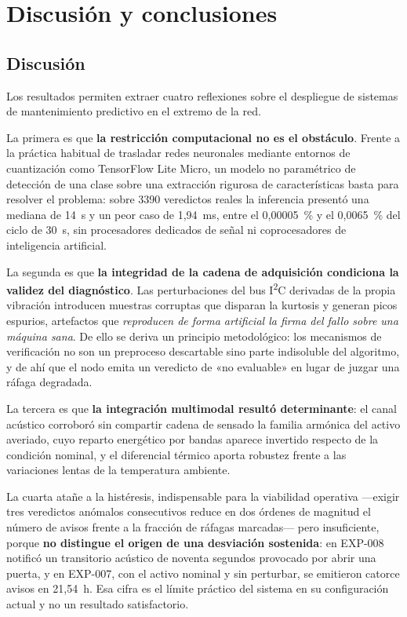 \chapter{Discusión y conclusiones}
\label{cap:conclusiones}

\section{Discusión}

Los resultados permiten extraer cuatro reflexiones sobre el despliegue de sistemas de
mantenimiento predictivo en el extremo de la red.

La primera es que \textbf{la restricción computacional no es el obstáculo}. Frente a la práctica
habitual de trasladar redes neuronales mediante entornos de cuantización como TensorFlow Lite
Micro, un modelo no paramétrico de detección de una clase sobre una extracción rigurosa de
características basta para resolver el problema: sobre 3390 veredictos reales la inferencia
presentó una mediana de \mbox{14 \textmu s} y un peor caso de \mbox{1,94 ms}, entre el
\mbox{0,00005~\%} y el \mbox{0,0065~\%} del ciclo de \mbox{30 s}, sin procesadores dedicados de
señal ni coprocesadores de inteligencia artificial.

La segunda es que \textbf{la integridad de la cadena de adquisición condiciona la validez del
diagnóstico}. Las perturbaciones del bus I\textsuperscript{2}C derivadas de la propia vibración
introducen muestras corruptas que disparan la kurtosis y generan picos espurios, artefactos que
\textit{reproducen de forma artificial la firma del fallo sobre una máquina sana}. De ello se
deriva un principio metodológico: los mecanismos de verificación no son un preproceso descartable
sino parte indisoluble del algoritmo, y de ahí que el nodo emita un veredicto de «no evaluable» en
lugar de juzgar una ráfaga degradada.

La tercera es que \textbf{la integración multimodal resultó determinante}: el canal acústico
corroboró sin compartir cadena de sensado la familia armónica del activo averiado, cuyo reparto
energético por bandas aparece invertido respecto de la condición nominal, y el diferencial térmico
aporta robustez frente a las variaciones lentas de la temperatura ambiente.

La cuarta atañe a la histéresis, indispensable para la viabilidad operativa —exigir tres
veredictos anómalos consecutivos reduce en dos órdenes de magnitud el número de avisos frente a la
fracción de ráfagas marcadas— pero insuficiente, porque \textbf{no distingue el origen de una
desviación sostenida}: en EXP-008 notificó un transitorio acústico de noventa segundos provocado
por abrir una puerta, y en EXP-007, con el activo nominal y sin perturbar, se emitieron catorce
avisos en \mbox{21,54 h}. Esa cifra es el límite práctico del sistema en su configuración actual y
no un resultado satisfactorio.

